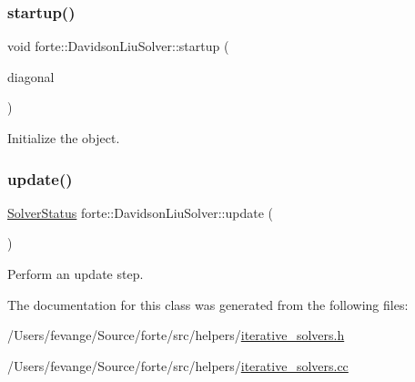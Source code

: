 \subsubsection{\texorpdfstring{startup()}{startup()}}
{\footnotesize\ttfamily void forte\+::\+Davidson\+Liu\+Solver\+::startup (\begin{DoxyParamCaption}\item[{psi\+::\+Shared\+Vector}]{diagonal }\end{DoxyParamCaption})}



Initialize the object. 

\mbox{\label{classforte_1_1_davidson_liu_solver_a332c9bab147d3a895caf073950e30dd1}} 
\subsubsection{\texorpdfstring{update()}{update()}}
{\footnotesize\ttfamily \mbox{\hyperlink{namespaceforte_a62f3fc3a26f13fb59a89be14ecc8fa07}{Solver\+Status}} forte\+::\+Davidson\+Liu\+Solver\+::update (\begin{DoxyParamCaption}{ }\end{DoxyParamCaption})}



Perform an update step. 



The documentation for this class was generated from the following files\+:\begin{DoxyCompactItemize}
\item 
/\+Users/fevange/\+Source/forte/src/helpers/\mbox{\hyperlink{iterative__solvers_8h}{iterative\+\_\+solvers.\+h}}\item 
/\+Users/fevange/\+Source/forte/src/helpers/\mbox{\hyperlink{iterative__solvers_8cc}{iterative\+\_\+solvers.\+cc}}\end{DoxyCompactItemize}

